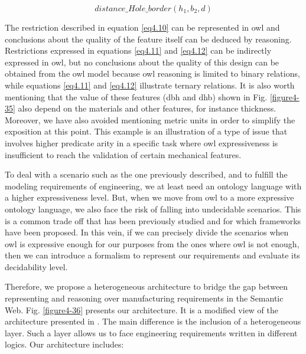 \begin{equation}\label{eq4.12}
distance\_Hole\_border(h_{1}, b_{2}, d)
\end{equation}


The restriction described in equation \ref{eq4.10} can be represented in \gls{owl} and conclusions about the quality of the feature itself can be deduced by reasoning. Restrictions expressed in equations \ref{eq4.11} and \ref{eq4.12} can be indirectly expressed in \gls{owl}, but no conclusions about the quality of this design can be obtained from the \gls{owl} model because \gls{owl} reasoning is limited to binary relations, while equations \ref{eq4.11} and \ref{eq4.12} illustrate ternary relations. It is also worth mentioning that the value of these features (dbh and dhb) shown in Fig. \ref{figure4-35} also depend on the materials and other features, for instance thickness. Moreover, we have also avoided mentioning metric units in order to simplify the exposition at this point. This example is an illustration of a type of issue that involves higher predicate arity in a specific task where \gls{owl} expressiveness is insufficient to reach the validation of certain mechanical features. 


To deal with a scenario such as the one previously described, and to fulfill the modeling requirements of engineering, we at least need an ontology language with a higher expressiveness level. But, when we move from \gls{owl} to a more expressive ontology language, we also face the risk of falling into undecidable scenarios. This is a common trade off that has been previously studied and for which frameworks have been proposed. In this vein, if we can precisely divide the scenarios when \gls{owl} is expressive enough for our purposes from the ones where \gls{owl} is not enough, then we can introduce a formalism to represent our requirements and evaluate its decidability level.

Therefore, we propose a heterogeneous architecture to bridge the gap between representing and reasoning over manufacturing requirements in the Semantic Web.  Fig. \ref{figure4-36} presents our architecture. It is a modified view of the architecture presented in \cite{w3c_product_2005}. The main difference is  the inclusion of a heterogeneous layer. Such a layer allows us to face engineering requirements written in different logics. Our architecture includes:  

